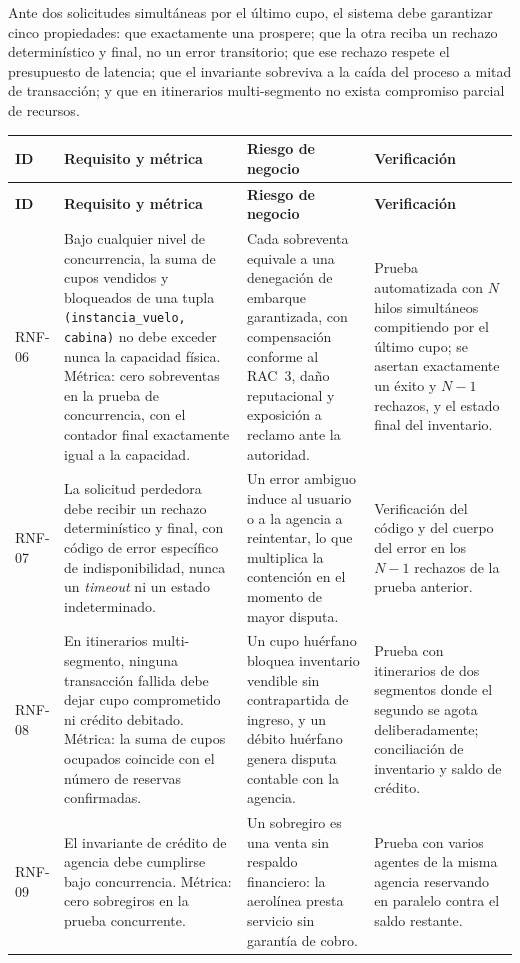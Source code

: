 \documentclass[10pt,letterpaper]{article}
\begin{document}
Ante dos solicitudes simultáneas por el último cupo, el sistema debe garantizar cinco propiedades: que exactamente una prospere; que la otra reciba un rechazo determinístico y final, no un error transitorio; que ese rechazo respete el presupuesto de latencia; que el invariante sobreviva a la caída del proceso a mitad de transacción; y que en itinerarios multi-segmento no exista compromiso parcial de recursos.

\begin{longtable}{@{}L{1.5cm} L{5.0cm} L{4.6cm} L{4.9cm}@{}}
\toprule \textbf{ID} & \textbf{Requisito y métrica} & \textbf{Riesgo de negocio} & \textbf{Verificación} \\ \midrule \endfirsthead
\toprule \textbf{ID} & \textbf{Requisito y métrica} & \textbf{Riesgo de negocio} & \textbf{Verificación} \\ \midrule \endhead
RNF-06 & Bajo cualquier nivel de concurrencia, la suma de cupos vendidos y bloqueados de una tupla \texttt{(instancia\_vuelo, cabina)} no debe exceder nunca la capacidad física. Métrica: cero sobreventas en la prueba de concurrencia, con el contador final exactamente igual a la capacidad. & Cada sobreventa equivale a una denegación de embarque garantizada, con compensación conforme al RAC~3, daño reputacional y exposición a reclamo ante la autoridad. & Prueba automatizada con $N$ hilos simultáneos compitiendo por el último cupo; se asertan exactamente un éxito y $N-1$ rechazos, y el estado final del inventario. \\
RNF-07 & La solicitud perdedora debe recibir un rechazo determinístico y final, con código de error específico de indisponibilidad, nunca un \emph{timeout} ni un estado indeterminado. & Un error ambiguo induce al usuario o a la agencia a reintentar, lo que multiplica la contención en el momento de mayor disputa. & Verificación del código y del cuerpo del error en los $N-1$ rechazos de la prueba anterior. \\
RNF-08 & En itinerarios multi-segmento, ninguna transacción fallida debe dejar cupo comprometido ni crédito debitado. Métrica: la suma de cupos ocupados coincide con el número de reservas confirmadas. & Un cupo huérfano bloquea inventario vendible sin contrapartida de ingreso, y un débito huérfano genera disputa contable con la agencia. & Prueba con itinerarios de dos segmentos donde el segundo se agota deliberadamente; conciliación de inventario y saldo de crédito. \\
RNF-09 & El invariante de crédito de agencia debe cumplirse bajo concurrencia. Métrica: cero sobregiros en la prueba concurrente. & Un sobregiro es una venta sin respaldo financiero: la aerolínea presta servicio sin garantía de cobro. & Prueba con varios agentes de la misma agencia reservando en paralelo contra el saldo restante. \\

\end{longtable}
\end{document}
